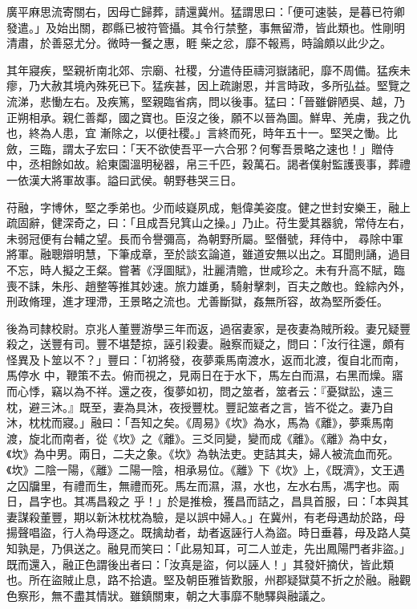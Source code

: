 \begin{pinyinscope}
 廣平麻思流寄關右，因母亡歸葬，請還冀州。猛謂思曰：「便可速裝，是暮已符卿發遣。」及始出關，郡縣已被符管攝。其令行禁整，事無留滯，皆此類也。性剛明清肅，於善惡尤分。微時一餐之惠，睚柴之忿，靡不報焉，時論頗以此少之。



 其年寢疾，堅親祈南北郊、宗廟、社稷，分遣侍臣禱河嶽諸祀，靡不周備。猛疾未瘳，乃大赦其境內殊死已下。猛疾甚，因上疏謝恩，并言時政，多所弘益。堅覽之流涕，悲慟左右。及疾篤，堅親臨省病，問以後事。猛曰：「晉雖僻陋吳、越，乃正朔相承。親仁善鄰，國之寶也。臣沒之後，願不以晉為圖。鮮卑、羌虜，我之仇也，終為人患，宜
 漸除之，以便社稷。」言終而死，時年五十一。堅哭之慟。比斂，三臨，謂太子宏曰：「天不欲使吾平一六合邪？何奪吾景略之速也！」贈侍中，丞相餘如故。給東園溫明秘器，帛三千匹，穀萬石。謁者僕射監護喪事，葬禮一依漢大將軍故事。謚曰武侯。朝野巷哭三日。



 苻融，字博休，堅之季弟也。少而岐嶷夙成，魁偉美姿度。健之世封安樂王，融上疏固辭，健深奇之，曰：「且成吾兒箕山之操。」乃止。苻生愛其器貌，常侍左右，未弱冠便有台輔之望。長而令譽彌高，為朝野所屬。堅僭號，拜侍中，
 尋除中軍將軍。融聰辯明慧，下筆成章，至於談玄論道，雖道安無以出之。耳聞則誦，過目不忘，時人擬之王粲。嘗著《浮圖賦》，壯麗清贍，世咸珍之。未有升高不賦，臨喪不誄，朱彤、趙整等推其妙速。旅力雄勇，騎射擊刺，百夫之敵也。銓綜內外，刑政脩理，進才理滯，王景略之流也。尤善斷獄，姦無所容，故為堅所委任。



 後為司隸校尉。京兆人董豐游學三年而返，過宿妻家，是夜妻為賊所殺。妻兄疑豐殺之，送豐有司。豐不堪楚掠，誣引殺妻。融察而疑之，問曰：「汝行往還，頗有怪異及卜筮以不？」豐曰：「初將發，夜夢乘馬南渡水，返而北渡，復自北而南，馬停水
 中，鞭策不去。俯而視之，見兩日在于水下，馬左白而濕，右黑而燥。寤而心悸，竊以為不祥。還之夜，復夢如初，問之筮者，筮者云：『憂獄訟，遠三枕，避三沐。』既至，妻為具沐，夜授豐枕。豐記筮者之言，皆不從之。妻乃自沐，枕枕而寢。」融曰：「吾知之矣。《周易》《坎》為水，馬為《離》，夢乘馬南渡，旋北而南者，從《坎》之《離》。三爻同變，變而成《離》。《離》為中女，《坎》為中男。兩日，二夫之象。《坎》為執法吏。吏詰其夫，婦人被流血而死。《坎》二陰一陽，《離》二陽一陰，相承易位。《離》下《坎》上，《既濟》，文王遇之囚牖里，有禮而生，無禮而死。馬左而濕，濕，水也，左水右馬，馮字也。兩日，昌字也。其馮昌殺之
 乎！」於是推檢，獲昌而詰之，昌具首服，曰：「本與其妻謀殺董豐，期以新沐枕枕為驗，是以誤中婦人。」在冀州，有老母遇劫於路，母揚聲唱盜，行人為母逐之。既擒劫者，劫者返誣行人為盜。時日垂暮，母及路人莫知孰是，乃俱送之。融見而笑曰：「此易知耳，可二人並走，先出鳳陽門者非盜。」既而還入，融正色謂後出者曰：「汝真是盜，何以誣人！」其發奸摘伏，皆此類也。所在盜賊止息，路不拾遺。堅及朝臣雅皆歎服，州郡疑獄莫不折之於融。融觀色察形，無不盡其情狀。雖鎮關東，朝之大事靡不馳驛與融議之。




\end{pinyinscope}

